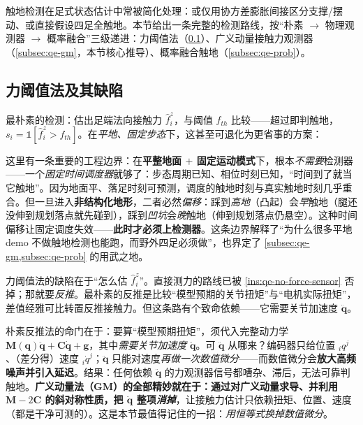 触地检测在足式状态估计中常被简化处理：或仅用协方差膨胀间接区分支撑/摆动、或直接假设四足全触地。本节给出一条完整的检测路线，按“朴素 $\to$ 物理观测器 $\to$ 概率融合”三级递进：力阈值法（\cref{subsec:qe-thresh}）、广义动量接触力观测器（\cref{subsec:qe-gm}，本节核心推导）、概率融合触地（\cref{subsec:qe-prob}）。

\subsection{力阈值法及其缺陷}
\label{subsec:qe-thresh}

最朴素的检测：估出足端法向接触力 $\hat f_i^z$，与阈值 $f_{th}$ 比较——超过即判触地，$s_i=\mathbb{1}[\hat f_i^z>f_{th}]$。在\emph{平地、固定步态}下，这甚至可退化为更省事的方案：

\begin{insight}\label{ins:qe-prob-boundary}
这里有一条重要的工程边界：在\textbf{平整地面 $+$ 固定运动模式}下，根本\emph{不需要}检测器——一个\emph{固定时间调度器}就够了：步态周期已知、相位时刻已知，“时间到了就当它触地”。因为地面平、落足时刻可预测，调度的触地时刻与真实触地时刻几乎重合。但一旦进入\textbf{非结构化地形}，二者必然\emph{偏移}：踩到\emph{高地}（凸起）会\emph{早}触地（腿还没伸到规划落点就先碰到），踩到\emph{凹坑}会\emph{晚}触地（伸到规划落点仍悬空）。这种时间偏移让固定调度失效——\textbf{此时才必须上检测器}。这条边界解释了“为什么很多平地 demo 不做触地检测也能跑，而野外四足必须做”，也界定了 \cref{subsec:qe-gm,subsec:qe-prob} 的用武之地。
\end{insight}

力阈值法的缺陷在于“怎么估 $\hat f_i^z$”。直接测力的路线已被 \cref{ins:qe-no-force-sensor} 否掉；那就要\emph{反推}。最朴素的反推是比较“模型预期的关节扭矩”与“电机实际扭矩”，差值经雅可比转置反推接触力。但这条路有个致命依赖——它需要关节加速度 $\ddot{\boldsymbol q}$。

\begin{insight}\label{ins:qe-gm-motivation}
朴素反推法的命门在于：要算“模型预期扭矩”，须代入完整动力学 $\mathbf{M}(\boldsymbol q)\ddot{\boldsymbol q}+\mathbf{C}\dot{\boldsymbol q}+\boldsymbol g$，其中\emph{需要关节加速度} $\ddot{\boldsymbol q}$。可 $\ddot{\boldsymbol q}$ 从哪来？编码器只给位置 ${}_iq^j$、（差分得）速度 ${}_i\dot q^j$；$\ddot{\boldsymbol q}$ 只能对速度\emph{再做一次数值微分}——而数值微分会\textbf{放大高频噪声并引入延迟}。结果：任何依赖 $\ddot{\boldsymbol q}$ 的力观测器信号都嘈杂、滞后，无法可靠判触地。\textbf{广义动量法（GM）的全部精妙就在于：通过对广义动量求导、并利用 $\dot{\mathbf{M}}-2\mathbf{C}$ 的斜对称性质，把 $\ddot{\boldsymbol q}$ 整项\emph{消掉}}，让接触力估计只依赖扭矩、位置、速度（都是干净可测的）。这是本节最值得记住的一招：\emph{用恒等式换掉数值微分}。
\end{insight}

